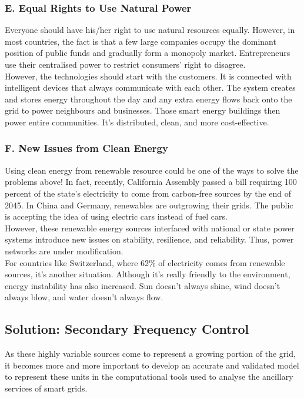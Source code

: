\documentclass{report}
\begin{document}
\subsubsection{E. Equal Rights to Use Natural Power}
Everyone should have his/her right to use natural resources equally. However, in most countries, the fact is that a few large companies occupy the dominant position of public funds and gradually form a monopoly market. Entrepreneurs use their centralised power to restrict consumers’ right to disagree.\\

However, the technologies should start with the customers. It is connected with intelligent devices that always communicate with each other. The system creates and stores energy throughout the day and any extra energy flows back onto the grid to power neighbours and businesses. Those smart energy buildings then power entire communities. It’s distributed, clean, and more cost-effective.\\

\subsubsection{F. New Issues from Clean Energy}
Using clean energy from renewable resource could be one of the ways to solve the problems above! In fact, recently, California Assembly passed a bill requiring 100 percent of the state’s electricity to come from carbon-free sources by the end of 2045. In China and Germany, renewables are outgrowing their grids. The public is accepting the idea of using electric cars instead of fuel cars.\\

However, these renewable energy sources interfaced with national or state power systems introduce new issues on stability, resilience, and reliability. Thus, power networks are under modification.\\

For countries like Switzerland, where 62\% of electricity comes from renewable sources, it’s another situation. Although it’s really friendly to the environment, energy instability has also increased. Sun doesn’t always shine, wind doesn’t always blow, and water doesn’t always flow.\\

\subsection{Solution: Secondary Frequency Control}
As these highly variable sources come to represent a growing portion of the grid, it becomes more and more important to develop an accurate and validated model to represent these units in the computational tools used to analyse the ancillary services of smart grids.\\
\end{document}
